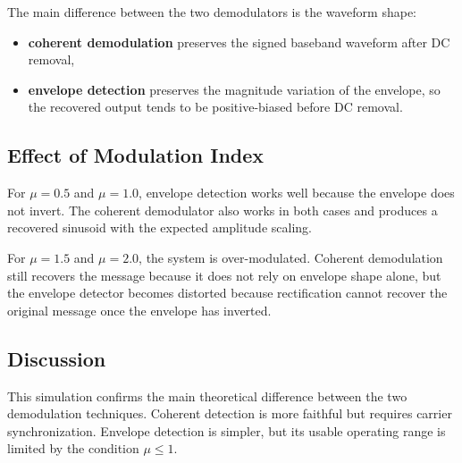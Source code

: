 The main difference between the two demodulators is the waveform shape:
\begin{itemize}
\item \textbf{coherent demodulation} preserves the signed baseband waveform after
DC removal,
\item \textbf{envelope detection} preserves the magnitude variation of the
envelope, so the recovered output tends to be positive-biased before DC removal.
\end{itemize}

\subsection{Effect of Modulation Index}

For $\mu = 0.5$ and $\mu = 1.0$, envelope detection works well because the
envelope does not invert. The coherent demodulator also works in both cases and
produces a recovered sinusoid with the expected amplitude scaling.

For $\mu = 1.5$ and $\mu = 2.0$, the system is over-modulated. Coherent
demodulation still recovers the message because it does not rely on envelope
shape alone, but the envelope detector becomes distorted because rectification
cannot recover the original message once the envelope has inverted.

\subsection{Discussion}

This simulation confirms the main theoretical difference between the two
demodulation techniques. Coherent detection is more faithful but requires
carrier synchronization. Envelope detection is simpler, but its usable operating
range is limited by the condition $\mu \le 1$.
